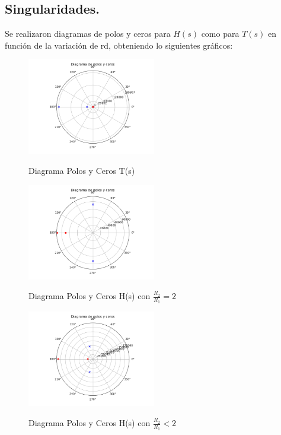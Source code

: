 \subsection{Singularidades.}
Se realizaron diagramas de polos y ceros para $H(s)$ como para $T(s)$ en función de la variación de rd, obteniendo lo siguientes gráficos:
\begin{figure}[H]
	\centering
	\includegraphics[width=0.5\textwidth]{Imagenes-Ej1/Tr=1.png}
	\label{fig:poleZeroDiagTs}
	\caption{Diagrama Polos y Ceros T(s)}
\end{figure}
\begin{figure}[H]
	\centering
	\includegraphics[width=0.5\textwidth]{Imagenes-Ej1/Hr=1.png}
	\label{fig:poleZeroDiagHs1}
	\caption{Diagrama Polos y Ceros H(s) con $\frac{R_2}{R_1}=2$}
\end{figure}
\begin{figure}[H]
	\centering
\includegraphics[width=0.5\textwidth]{Imagenes-Ej1/Hrmin1.png}
	\label{fig:poleZeroDiagHsmin}
	\caption{Diagrama Polos y Ceros H(s) con $\frac{R_2}{R_1}<2$}
\end{figure}
